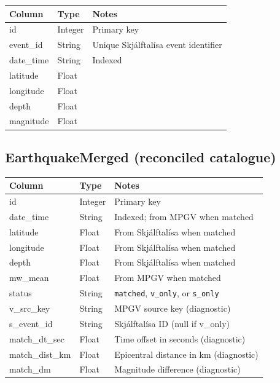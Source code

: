 \documentclass[12pt]{article}
\begin{document}
\begin{table}[H]
\centering
\small
\begin{tabular}{l l l}
\hline
\textbf{Column} & \textbf{Type} & \textbf{Notes} \\
\hline
id         & Integer & Primary key \\
event\_id  & String  & Unique Skjálftalísa event identifier \\
date\_time & String  & Indexed \\
latitude   & Float   & \\
longitude  & Float   & \\
depth      & Float   & \\
magnitude  & Float   & \\
\hline
\end{tabular}
\end{table}

\subsection*{EarthquakeMerged (reconciled catalogue)}

\begin{table}[H]
\centering
\small
\begin{tabular}{l l l}
\hline
\textbf{Column} & \textbf{Type} & \textbf{Notes} \\
\hline
id             & Integer & Primary key \\
date\_time     & String  & Indexed; from MPGV when matched \\
latitude       & Float   & From Skjálftalísa when matched \\
longitude      & Float   & From Skjálftalísa when matched \\
depth          & Float   & From Skjálftalísa when matched \\
mw\_mean       & Float   & From MPGV when matched \\
status         & String  & \texttt{matched}, \texttt{v\_only}, or \texttt{s\_only} \\
v\_src\_key    & String  & MPGV source key (diagnostic) \\
s\_event\_id   & String  & Skjálftalísa ID (null if v\_only) \\
match\_dt\_sec & Float   & Time offset in seconds (diagnostic) \\
match\_dist\_km & Float  & Epicentral distance in km (diagnostic) \\
match\_dm      & Float   & Magnitude difference (diagnostic) \\
\hline
\end{tabular}
\end{table}
\end{document}
